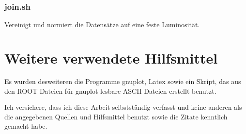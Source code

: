 \documentclass[a4paper,twoside]{scrartcl}
\begin{document}
\begin{appendix}
    \subsubsection{join.sh}
    \label{src:join.sh}
    Vereinigt und normiert die Datensätze auf eine feste Luminosität.
    \ifsources
      
      
    \fi
  \section*{Weitere verwendete Hilfsmittel}
  Es wurden desweiteren die Programme gnuplot, Latex sowie ein Skript, das aus
  den ROOT-Dateien für gnuplot lesbare ASCII-Dateien erstellt benutzt.
\end{appendix}

\newpage
\pagestyle{plain}
\huge{Ich versichere, dass ich diese Arbeit selbstständig verfasst und keine
anderen als die angegebenen Quellen und Hilfsmittel benutzt sowie die Zitate
kenntlich gemacht habe.}
\end{document}
